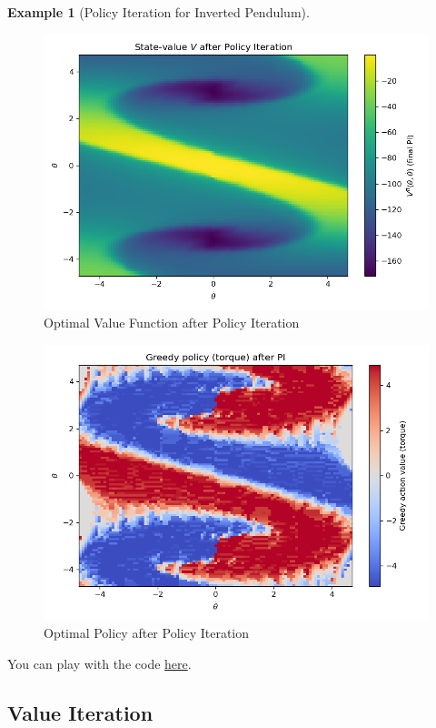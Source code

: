 \documentclass[
]{book}
\theoremstyle{definition}
\theoremstyle{definition}
\newtheorem{example}{Example}[chapter]
\theoremstyle{definition}
\theoremstyle{definition}
\theoremstyle{remark}
\begin{document}
\begin{example}[Policy Iteration for Inverted Pendulum]
\begin{figure}

{\centering \includegraphics[width=0.8\linewidth]{images/MDP/pendulum_PI_value} 

}

\caption{Optimal Value Function after Policy Iteration}\label{fig:mdp-pendulum-PI-value}
\end{figure}

\begin{figure}

{\centering \includegraphics[width=0.8\linewidth]{images/MDP/pendulum_PI_policy} 

}

\caption{Optimal Policy after Policy Iteration}\label{fig:mdp-pendulum-PI-policy}
\end{figure}

You can play with the code \href{https://github.com/ComputationalRobotics/2025-ES-AM-158-LECTURE-CODE/blob/main/pendulum_policy_iteration.py}{here}.
\end{example}

\subsection{Value Iteration}\label{value-iteration}
\end{document}
